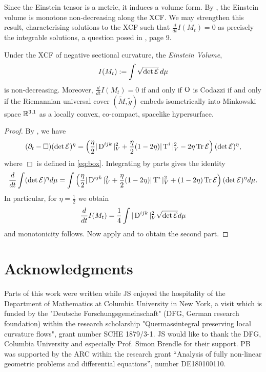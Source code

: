 \documentclass[a4paper,12pt]{amsart}
\begin{document}
Since the Einstein tensor is a metric, it induces a volume form. By \cite[Proposition 9]{MR2055396}, the Einstein volume is monotone non-decreasing along the XCF. We may strengthen this result, characterising solutions to the XCF such that \(\frac{d}{dt} I(M_t) = 0\) as precisely the integrable solutions, a question posed in \cite{MR2055396}, page 9.

\begin{thm}
\label{thm:volume_monotonicity}
Under the XCF of negative sectional curvature, the \emph{Einstein Volume},
\[
I(M_t):=\int \sqrt{\det\operatorname{\mathcal{E}}}\,d\mu
\]
is non-decreasing. Moreover, \(\frac{d}{dt} I(M_t)= 0\) if and only if \(\operatorname{O}\) is Codazzi if and only if the Riemannian universal cover \((\tilde{M}, \tilde{g})\) embeds isometrically into Minkowski space \(\mathbb{R}^{3,1}\) as a locally convex, co-compact, spacelike hypersurface.
\end{thm}

\begin{proof}
By \cite[Proposition 9]{MR2055396}, we have
\[
(\partial_t - \Box) (\det\operatorname{\mathcal{E}})^\eta = \left(\frac{\eta}{2}|\operatorname{D}^{ijk}|_V^2 + \frac{\eta}{2}(1-2\eta)|\operatorname{T}^i|^2_V - 2\eta\operatorname{Tr}\operatorname{\mathcal{E}}\right)(\det\operatorname{\mathcal{E}})^\eta,
\]
where \(\Box\) is defined in \eqref{eq:box}. Integrating by parts gives the identity
\[
\frac{d}{dt}\int(\det\operatorname{\mathcal{E}})^\eta d\mu = \int \left(\frac{\eta}{2}|\operatorname{D}^{ijk}|_V^2 + \frac{\eta}{2}(1-2\eta)|\operatorname{T}^i|^2_V + (1-2\eta)\operatorname{Tr}\operatorname{\mathcal{E}}\right)(\det\operatorname{\mathcal{E}})^\eta d\mu.
\]
In particular, for $\eta=\frac{1}{2}$ we obtain
\[
\frac{d}{dt}I(M_t) = \frac{1}{4}\int |\operatorname{D}^{ijk}|_V^2\sqrt{\det\operatorname{\mathcal{E}}}d\mu
\]
and monotonicity follows. Now apply  and  to obtain the second part.
\end{proof}

\section*{Acknowledgments}

Parts of this work were written while JS enjoyed the hospitality of the Department of Mathematics at Columbia University in New York, a visit which is funded by the "Deutsche Forschungsgemeinschaft" (DFG, German research foundation) within the research scholarship "Quermassintegral preserving local curvature flows", grant number SCHE 1879/3-1. JS would like to thank the DFG, Columbia University and especially Prof. Simon Brendle for their support. PB was supported by the ARC within the research grant “Analysis of fully non-linear geometric problems and differential equations”, number DE180100110.


\printbibliography
\end{document}
